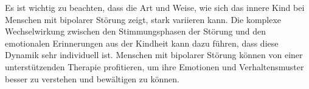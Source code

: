 %
Es ist wichtig zu beachten, dass die Art und Weise, wie sich das innere Kind bei Menschen mit bipolarer Störung zeigt, stark variieren kann. Die komplexe Wechselwirkung zwischen den Stimmungsphasen der Störung und den emotionalen Erinnerungen aus der Kindheit kann dazu führen, dass diese Dynamik sehr individuell ist. Menschen mit bipolarer Störung können von einer unterstützenden Therapie profitieren, um ihre Emotionen und Verhaltensmuster besser zu verstehen und bewältigen zu können.



